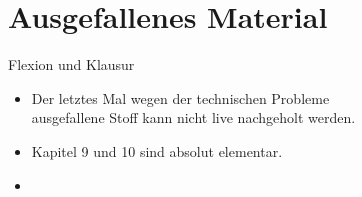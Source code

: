 \section[Ausfall]{Ausgefallenes Material}

\begin{frame}
  {Flexion und Klausur}
  \pause
  \begin{itemize}[<+->]
    \item Der letztes Mal wegen der technischen Probleme\\
      ausgefallene Stoff kann nicht live nachgeholt werden.
    \item \alert{Kapitel 9 und 10 sind absolut elementar.}
    \item {}
  \end{itemize}
\end{frame}

% 

